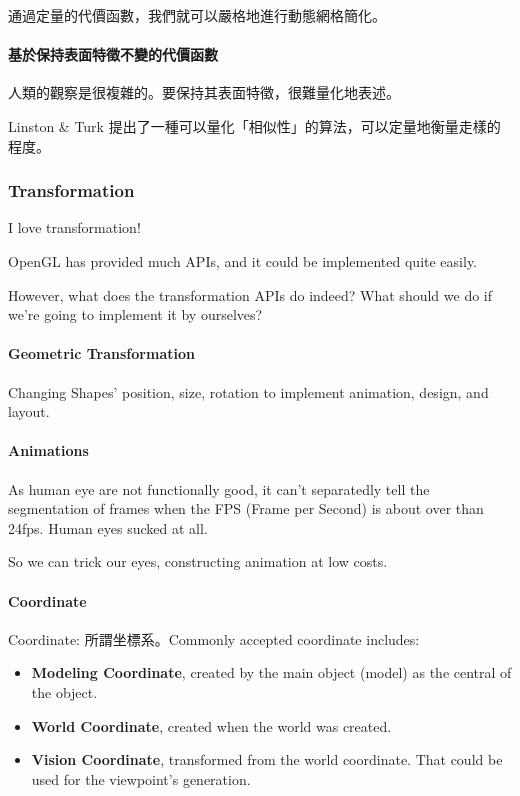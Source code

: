 \documentclass[
]{article}
\begin{document}
通過定量的代價函數，我們就可以嚴格地進行動態網格簡化。

\hypertarget{header-n40}{%
\paragraph{基於保持表面特徵不變的代價函數}\label{header-n40}}

人類的觀察是很複雜的。要保持其表面特徵，很難量化地表述。

Linston \& Turk
提出了一種可以量化「相似性」的算法，可以定量地衡量走樣的程度。

\hypertarget{header-n43}{%
\subsubsection{Transformation}\label{header-n43}}

I love transformation!

OpenGL has provided much APIs, and it could be implemented quite easily.

However, what does the transformation APIs do indeed? What should we do
if we're going to implement it by ourselves?

\hypertarget{header-n47}{%
\paragraph{Geometric Transformation}\label{header-n47}}

Changing Shapes' position, size, rotation to implement animation,
design, and layout.

\hypertarget{header-n49}{%
\paragraph{Animations}\label{header-n49}}

As human eye are not functionally good, it can't separatedly tell the
segmentation of frames when the FPS (Frame per Second) is about over
than 24fps. Human eyes sucked at all.

So we can trick our eyes, constructing animation at low costs.

\hypertarget{header-n52}{%
\paragraph{Coordinate}\label{header-n52}}

Coordinate: 所謂坐標系。Commonly accepted coordinate includes:

\begin{itemize}
\item
  \textbf{Modeling Coordinate}, created by the main object (model) as
  the central of the object. 
\item
  \textbf{World Coordinate}, created when the world was created.
\item
  \textbf{Vision Coordinate}, transformed from the world coordinate.
  That could be used for the viewpoint's generation.
\end{itemize}
\end{document}
